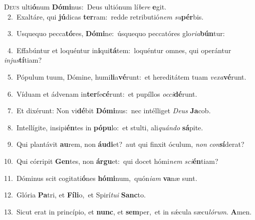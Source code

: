 \lettrine{\initial\textcolor{\initialcolor}{D}}{eus} ulti\-\textbf{ó}\-num \textbf{Dó}\-\textbf{mi}nus:~\star Deus ultiónum lí\-\textit{be}\-\textit{re} \textbf{e}\-git.\\
{\numbfont\textcolor{\numbcolor}{~2.}}~Exaltáre, qui \textbf{jú}\-dicas \textbf{ter}\-ram:~\star redde retributió\textit{nem} \textit{su}\-\textbf{pér}bis.\par
{\numbfont\textcolor{\numbcolor}{~3.}}~Usquequo pecca\-\textbf{tó}\-res, \textbf{Dó}\-\textbf{mi}ne:~\star úsquequo peccatóres glo\-\textit{ri}\-\textit{a}\textbf{bún}tur:\par
{\numbfont\textcolor{\numbcolor}{~4.}}~Effabúntur et loquéntur in\-\textbf{i}\-qui\-\textbf{tá}\-tem:~\star loquéntur omnes, qui operántur \textit{in}\-\textit{jus}\textbf{tí}tiam?\par
{\numbfont\textcolor{\numbcolor}{~5.}}~Pópulum tuum, Dómine, humi\-\textbf{li}\-a\-\textbf{vé}\-runt:~\star et hereditátem tuam \textit{ve}\-\textit{xa}\textbf{vé}runt.\par
{\numbfont\textcolor{\numbcolor}{~6.}}~Víduam et ádvenam in\-\textbf{ter}\-fe\-\textbf{cé}\-runt:~\star et pupíllos \textit{oc}\-\textit{ci}\textbf{dé}runt.\par
{\numbfont\textcolor{\numbcolor}{~7.}}~Et dixérunt: Non vi\-\textbf{dé}\-bit \textbf{Dó}\-\textbf{mi}nus:~\star nec intélliget \textit{De}\-\textit{us} \textbf{Ja}\-cob.\par
{\numbfont\textcolor{\numbcolor}{~8.}}~Intellígite, insipi\-\textbf{én}\-tes in \textbf{pó}\-\textbf{pu}lo:~\star et stulti, ali\-\textit{quán}\-\textit{do} \textbf{sá}\-pite.\par
{\numbfont\textcolor{\numbcolor}{~9.}}~Qui plantávit \textbf{au}\-rem, non \textbf{áu}\-\textbf{di}et?~\star aut qui finxit óculum, \textit{non} \textit{con}\-\textbf{sí}derat?\par
{\numbfont\textcolor{\numbcolor}{10.}}~Qui córripit \textbf{Gen}\-tes, non \textbf{ár}\-\textbf{gu}et:~\star qui docet hómi\textit{nem} \textit{sci}\-\textbf{én}tiam?\par
{\numbfont\textcolor{\numbcolor}{11.}}~Dóminus scit cogitati\-\textbf{ó}\-nes \textbf{hó}\-\textbf{mi}num,~\star quón\-\textit{i}\-\textit{am} \textbf{va}\-næ sunt.\par
{\numbfont\textcolor{\numbcolor}{12.}}~Glória \textbf{Pa}\-tri, et \textbf{Fí}\-\textbf{li}o,~\star et Spirí\-\textit{tu}\-\textit{i} \textbf{Sanc}\-to.\par
{\numbfont\textcolor{\numbcolor}{13.}}~Sicut erat in princípio, et \textbf{nunc}\-, et \textbf{sem}\-per,~\star et in sǽcula sæcu\-\textit{ló}\-\textit{rum}. \textbf{A}\-men.\par
